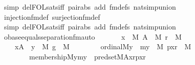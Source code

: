\begin{isabellebody}
\ {\isacharparenleft}{\kern0pt}simp\ del{\isacharcolon}{\kern0pt}FOL{\isacharunderscore}{\kern0pt}sats{\isacharunderscore}{\kern0pt}iff\ pair{\isacharunderscore}{\kern0pt}abs\ add{\isacharcolon}{\kern0pt}\ fm{\isacharunderscore}{\kern0pt}defs\ nat{\isacharunderscore}{\kern0pt}simp{\isacharunderscore}{\kern0pt}union{\isacharparenright}{\kern0pt}\isanewline
\ \ \isamarkupfalse%
\ injection{\isacharunderscore}{\kern0pt}fm{\isacharunderscore}{\kern0pt}def\ surjection{\isacharunderscore}{\kern0pt}fm{\isacharunderscore}{\kern0pt}def\isanewline
\ \ \isamarkupfalse%
\ {\isacharparenleft}{\kern0pt}simp\ del{\isacharcolon}{\kern0pt}FOL{\isacharunderscore}{\kern0pt}sats{\isacharunderscore}{\kern0pt}iff\ pair{\isacharunderscore}{\kern0pt}abs\ add{\isacharcolon}{\kern0pt}\ fm{\isacharunderscore}{\kern0pt}defs\ nat{\isacharunderscore}{\kern0pt}simp{\isacharunderscore}{\kern0pt}union{\isacharparenright}{\kern0pt}\isanewline
\ \ \isamarkupfalse%
%
\endisatagproof
{\isafoldproof}%
%
\isadelimproof
\isanewline
%
\endisadelimproof
\isanewline
\isanewline
{}\isamarkupfalse%
\ obase{\isacharunderscore}{\kern0pt}equals{\isacharunderscore}{\kern0pt}separation{\isacharunderscore}{\kern0pt}fm{\isacharunderscore}{\kern0pt}auto{\isacharcolon}{\kern0pt}\isanewline
\ \ \isanewline
\ \ \ \ {\isachardoublequoteopen}x\ {\isasymin}\ M{\isachardoublequoteclose}\ {\isachardoublequoteopen}A\ {\isasymin}\ M{\isachardoublequoteclose}\ {\isachardoublequoteopen}r\ {\isasymin}\ M{\isachardoublequoteclose}\ \isanewline
\ \ \isanewline
\ \ \ \ {\isachardoublequoteopen}{\isacharparenleft}{\kern0pt}x{\isasymin}A\ {\isasymlongrightarrow}\ {\isasymnot}{\isacharparenleft}{\kern0pt}{\isasymexists}y\ {\isasymin}\ M{\isachardot}{\kern0pt}\ {\isasymexists}g\ {\isasymin}\ M{\isachardot}{\kern0pt}\isanewline
\ \ \ \ \ \ \ \ ordinal{\isacharparenleft}{\kern0pt}{\isacharhash}{\kern0pt}{\isacharhash}{\kern0pt}M{\isacharcomma}{\kern0pt}y{\isacharparenright}{\kern0pt}\ {\isasymand}\ {\isacharparenleft}{\kern0pt}{\isasymexists}my\ {\isasymin}\ M{\isachardot}{\kern0pt}\ {\isasymexists}pxr\ {\isasymin}\ M{\isachardot}{\kern0pt}\isanewline
\ \ \ \ \ \ \ \ membership{\isacharparenleft}{\kern0pt}{\isacharhash}{\kern0pt}{\isacharhash}{\kern0pt}M{\isacharcomma}{\kern0pt}y{\isacharcomma}{\kern0pt}my{\isacharparenright}{\kern0pt}\ {\isasymand}\ pred{\isacharunderscore}{\kern0pt}set{\isacharparenleft}{\kern0pt}{\isacharhash}{\kern0pt}{\isacharhash}{\kern0pt}M{\isacharcomma}{\kern0pt}A{\isacharcomma}{\kern0pt}x{\isacharcomma}{\kern0pt}r{\isacharcomma}{\kern0pt}pxr{\isacharparenright}{\kern0pt}\ {\isasymand}\isanewline

\end{isabellebody}
